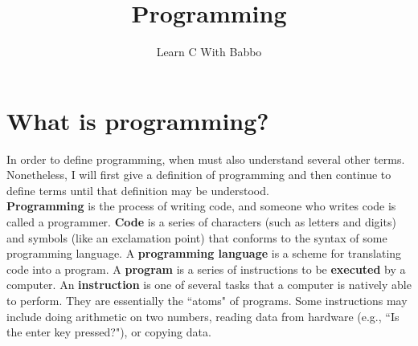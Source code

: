 \documentclass{article}
\begin{document}
\title{Programming}
\author{Learn C With Babbo}
\date{}
\maketitle

\section*{What is programming?}
In order to define programming, when must also understand several other terms. Nonetheless, I will first give a 
definition of programming and then continue to define terms until that definition may be understood. \\

\textbf{Programming} is the process of writing code, and someone who writes code is called a programmer. \textbf{Code}
is a series of characters (such as letters and digits) and symbols (like an exclamation point) that conforms to the 
syntax of some programming language. A \textbf{programming language} is a scheme for translating code into a program.
A \textbf{program} is a series of instructions to be \textbf{executed} by a computer. An \textbf{instruction} is
one of several tasks that a computer is natively able to perform. They are essentially the ``atoms" of programs.
Some instructions may include doing arithmetic on two numbers, reading data from hardware (e.g., ``Is the enter key 
pressed?"), or copying data. \\
\end{document}
